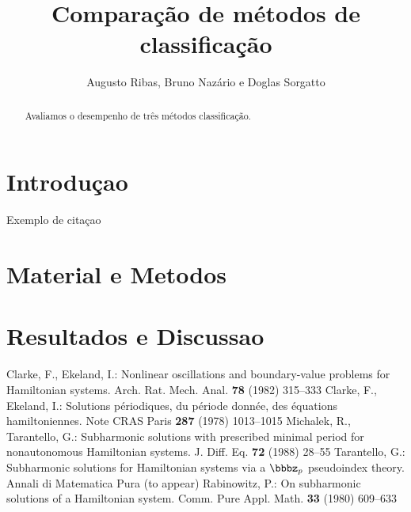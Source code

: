 %


\title{Comparação de métodos de classificação}

\author{Augusto Ribas, Bruno Nazário e Doglas Sorgatto}


\maketitle

\begin{abstract}
Avaliamos o desempenho de três métodos classificação.
\end{abstract}
%
\section{Introduçao}

Exemplo de citaçao  \cite{clar:eke}
\section{Material e Metodos}
\section{Resultados e Discussao}


%
%
\begin{thebibliography}{5}
%
Clarke, F., Ekeland, I.:
Nonlinear oscillations and
boundary-value problems for Hamiltonian systems.
Arch. Rat. Mech. Anal. {\bf 78} (1982) 315--333
%
Clarke, F., Ekeland, I.:
Solutions p\'{e}riodiques, du
p\'{e}riode donn\'{e}e, des \'{e}quations hamiltoniennes.
Note CRAS Paris {\bf 287} (1978) 1013--1015
%
Michalek, R., Tarantello, G.:
Subharmonic solutions with prescribed minimal
period for nonautonomous Hamiltonian systems.
J. Diff. Eq. {\bf 72} (1988) 28--55
%
Tarantello, G.:
Subharmonic solutions for Hamiltonian
systems via a $\bbbz_{p}$ pseudoindex theory.
Annali di Matematica Pura (to appear)
%
Rabinowitz, P.:
On subharmonic solutions of a Hamiltonian system.
Comm. Pure Appl. Math. {\bf 33} (1980) 609--633
\end{thebibliography}
%

